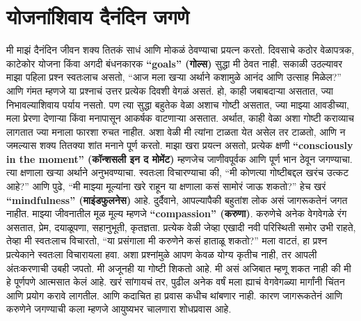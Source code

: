  \chapter{योजनांशिवाय दैनंदिन जगणे}
मी माझं दैनंदिन जीवन शक्य तितकं साधं आणि मोकळं ठेवण्याचा प्रयत्न करतो. दिवसाचे कठोर वेळापत्रक, काटेकोर योजना किंवा अगदी बंधनकारक \textbf{“goals” (गोल्स)} सुद्धा मी ठेवत नाही. सकाळी उठल्यावर माझा पहिला प्रश्न स्वतःलाच असतो,  “आज मला खऱ्या अर्थाने कशामुळे आनंद आणि उत्साह मिळेल?” आणि गंमत म्हणजे या प्रश्नाचं उत्तर प्रत्येक दिवशी वेगळं असतं.
हो, काही जबाबदाऱ्या असतात, ज्या निभावल्याशिवाय पर्याय नसतो. पण त्या सुद्धा बहुतेक वेळा अशाच गोष्टी असतात, ज्या माझ्या आवडीच्या, मला प्रेरणा देणाऱ्या किंवा मनापासून आकर्षक वाटणाऱ्या असतात. अर्थात, काही वेळा अशा गोष्टी कराव्याच लागतात ज्या मनाला फारशा रुचत नाहीत. अशा वेळी मी त्यांना टाळता येत असेल तर टाळतो, आणि न जमल्यास शक्य तितक्या शांत मनाने पूर्ण करतो.
माझा खरा प्रयत्न असतो,  प्रत्येक क्षणी \textbf{“consciously in the moment” (कॉन्शसली इन द मोमेंट)} म्हणजेच जाणीवपूर्वक आणि पूर्ण भान ठेवून जगण्याचा. त्या क्षणाला खऱ्या अर्थाने अनुभवण्याचा. स्वतःला विचारण्याचा की,  “मी कोणत्या गोष्टीबद्दल खरंच उत्कट आहे?” आणि पुढे, “मी माझ्या मूल्यांना खरे राहून या क्षणाला कसं सामोरं जाऊ शकतो?” हेच खरं \textbf{“mindfulness” (माइंडफुलनेस)} आहे. दुर्दैवाने, आपल्यापैकी बहुतांश लोक असं जागरूकतेनं जगत नाहीत.
माझ्या जीवनातील मूळ मूल्य म्हणजे \textbf{“compassion” (करुणा)}. करुणेचे अनेक वेगवेगळे रंग असतात,  प्रेम, दयाळूपणा, सहानुभूती, कृतज्ञता. प्रत्येक वेळी जेव्हा एखादी नवी परिस्थिती समोर उभी राहते, तेव्हा मी स्वतःलाच विचारतो,  “या प्रसंगाला मी करुणेने कसं हाताळू शकतो?” मला वाटतं, हा प्रश्न प्रत्येकाने स्वतःला विचारायला हवा. अशा प्रश्नांमुळे आपण केवळ योग्य कृतीच नाही, तर आपली अंतःकरणाची उबही जपतो.
मी अजूनही या गोष्टी शिकतो आहे. मी असं अजिबात म्हणू शकत नाही की मी हे पूर्णपणे आत्मसात केलं आहे. खरं सांगायचं तर, पुढील अनेक वर्षं मला ह्याचं वेगवेगळ्या मार्गांनी चिंतन आणि प्रयोग करावे लागतील. आणि कदाचित हा प्रवास कधीच थांबणार नाही. कारण जागरूकतेनं आणि करुणेने जगण्याची कला म्हणजे आयुष्यभर चालणारा शोधप्रवास आहे.

